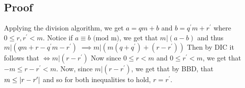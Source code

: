 \documentclass[oneside]{book}
\newcommand\tab[1][1cm]{\hspace*{#1}}
\newcommand\nextline{\newline\tab}
\renewcommand\mod[1]{\text{ (mod #1)}}
\begin{document}
\subsection{Proof}
\tab
Applying the division algorithm, we get $a=qm+b$ and $b=q^\prime m+r^\prime$ where $0\leq r,r^\prime < m$.\nextline
Notice if $a\equiv b\mod{m}$, we get that $m\lvert(a-b)$ and thus $m\lvert(qm+r - q^\prime m - r^\prime)$\nextline
$\implies m\lvert(m(q+q^\prime) + (r-r^\prime))$ Then by DIC it follows that \nextline
$\iff m\lvert (r-r^\prime)$ \nextline
Now since $0\leq r < m$ and $0 \leq r^\prime < m$, we get that $-m\leq r-r^\prime < m$. Now, since $m\lvert(r-r^\prime)$, we get that by BBD, that $m\leq \lvert r-r^\prime\rvert$ and so for both inequalities to hold, $r=r^\prime$.
\end{document}
